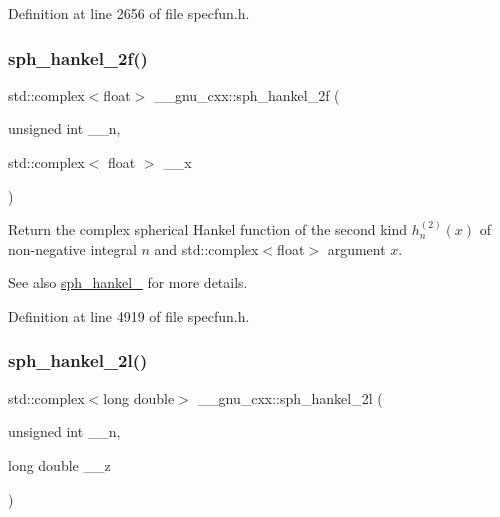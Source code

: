 Definition at line 2656 of file specfun.\+h.

\mbox{\label{group__gnu__math__spec__func_ga4c3194b71831b265811f987cbbf6e031}} 
\subsubsection{\texorpdfstring{sph\+\_\+hankel\+\_\+2f()}{sph\_hankel\_2f()}\hspace{0.1cm}{\footnotesize\ttfamily [2/2]}}
{\footnotesize\ttfamily std\+::complex$<$float$>$ \+\_\+\+\_\+gnu\+\_\+cxx\+::sph\+\_\+hankel\+\_\+2f (\begin{DoxyParamCaption}\item[{unsigned int}]{\+\_\+\+\_\+n,  }\item[{std\+::complex$<$ float $>$}]{\+\_\+\+\_\+x }\end{DoxyParamCaption})\hspace{0.3cm}{\ttfamily [inline]}}

Return the complex spherical Hankel function of the second kind $ h^{(2)}_n(x) $ of non-\/negative integral $ n $ and {\ttfamily std\+::complex$<$float$>$} argument $ x $.

\begin{DoxySeeAlso}{See also}
\hyperlink{group__gnu__math__spec__func_ga1ca08866a25e3637b04c57ff5a0c36a5}{sph\+\_\+hankel\+\_} for more details. 
\end{DoxySeeAlso}


Definition at line 4919 of file specfun.\+h.

\mbox{\label{group__gnu__math__spec__func_ga6d3ead73a4f0bfeeb0aa1fd99daaf3b1}} 
\subsubsection{\texorpdfstring{sph\+\_\+hankel\+\_\+2l()}{sph\_hankel\_2l()}\hspace{0.1cm}{\footnotesize\ttfamily [1/2]}}
{\footnotesize\ttfamily std\+::complex$<$long double$>$ \+\_\+\+\_\+gnu\+\_\+cxx\+::sph\+\_\+hankel\+\_\+2l (\begin{DoxyParamCaption}\item[{unsigned int}]{\+\_\+\+\_\+n,  }\item[{long double}]{\+\_\+\+\_\+z }\end{DoxyParamCaption})\hspace{0.3cm}{\ttfamily [inline]}}

